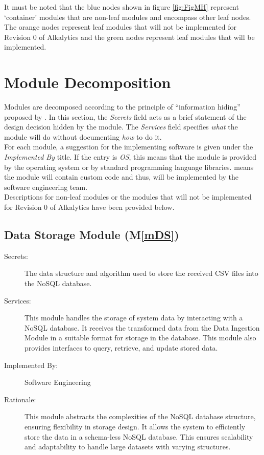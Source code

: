 \documentclass[12pt, titlepage]{article}
\newcommand{\mref}[1]{M\ref{#1}}
\begin{document}
It must be noted that the blue nodes shown in figure \ref{fig:FigMH} represent 
`container' modules that are non-leaf modules and encompass other leaf nodes.
The orange nodes represent leaf modules that will not be implemented for Revision
0 of Alkalytics and the green nodes represent leaf modules that will be implemented.

\section{Module Decomposition} \label{SecMD}

Modules are decomposed according to the principle of ``information hiding''
proposed by \citet{ParnasEtAl1984}. In this section, the \emph{Secrets} field acts as a brief
statement of the design decision hidden by the module. The \emph{Services} field specifies
\emph{what} the module will do without documenting \emph{how} to do it.\\
\newline
For each module, a suggestion for the implementing software is given under the 
\emph{Implemented By} title. If the entry is \emph{OS}, this means that the module is
provided by the operating system or by standard programming language libraries.
\emph{\progname{}} means the module will contain custom code and thus, will be implemented
by the software engineering team.\\
\newline
Descriptions for non-leaf modules or the modules that will not be implemented for Revision 0 of
Alkalytics have been provided below.

\subsection{Data Storage Module (\mref{mDS})}
\begin{description}
  \item[Secrets:] The data structure and algorithm used to store the received CSV files into the
  NoSQL database.
  \item[Services:] This module handles the storage of system data by interacting with
  a NoSQL database. It receives the transformed data from the Data Ingestion Module in a suitable
  format for storage in the database. This module also provides interfaces to query, retrieve, and
  update stored data.
  \item[Implemented By:] Software Engineering
  \item[Rationale:] This module abstracts the complexities of the NoSQL database
  structure, ensuring flexibility in storage design. It allows the system to 
  efficiently store the data in a schema-less NoSQL database. This ensures scalability and 
  adaptability to handle large datasets with varying structures.
\end{description}
\end{document}

